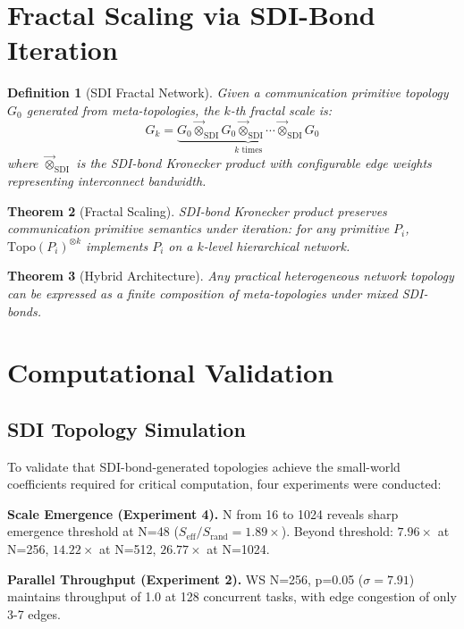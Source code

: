 \documentclass[12pt]{article}
\newtheorem{theorem}{Theorem}[section]
\newtheorem{definition}[theorem]{Definition}
\begin{document}
\section{Fractal Scaling via SDI-Bond Iteration}

\begin{definition}[SDI Fractal Network]
Given a communication primitive topology $G_0$ generated from
meta-topologies, the $k$-th fractal scale is:
\begin{equation}
G_k = \underbrace{G_0 \vec{\otimes}_{\text{SDI}} G_0
\vec{\otimes}_{\text{SDI}} \cdots \vec{\otimes}_{\text{SDI}}
G_0}_{k \text{ times}}
\end{equation}
where $\vec{\otimes}_{\text{SDI}}$ is the SDI-bond Kronecker product
with configurable edge weights representing interconnect bandwidth.
\end{definition}

\begin{theorem}[Fractal Scaling]
SDI-bond Kronecker product preserves communication primitive semantics
under iteration: for any primitive $P_i$, $\text{Topo}(P_i)^{\otimes k}$
implements $P_i$ on a $k$-level hierarchical network.
\end{theorem}

\begin{theorem}[Hybrid Architecture]
Any practical heterogeneous network topology can be expressed as a
finite composition of meta-topologies under mixed SDI-bonds.
\end{theorem}

\section{Computational Validation}

\subsection{SDI Topology Simulation}

To validate that SDI-bond-generated topologies achieve the
small-world coefficients required for critical computation, four
experiments were conducted:

\textbf{Scale Emergence (Experiment 4).} N from 16 to 1024 reveals
sharp emergence threshold at N=48 ($S_{\text{eff}}/S_{\text{rand}} =
1.89\times$). Beyond threshold: $7.96\times$ at N=256,
$14.22\times$ at N=512, $26.77\times$ at N=1024.

\textbf{Parallel Throughput (Experiment 2).} WS N=256, p=0.05
($\sigma=7.91$) maintains throughput of 1.0 at 128 concurrent tasks,
with edge congestion of only 3-7 edges.
\end{document}
